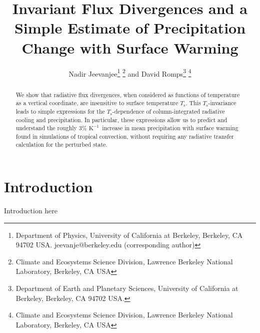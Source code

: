 \documentclass[10pt]{article}
\newcommand{\Ts}{\ensuremath{T_\mathrm{s}}}
\newcommand{\Kinverse}{\ensuremath{\mathrm{K^{-1}}}}
\begin{document}
%
%


\title{Invariant Flux Divergences and a Simple Estimate of Precipitation Change with Surface Warming}

%
%


 \author{Nadir Jeevanjee\footnote{Department of Physics, University of California at Berkeley, Berkeley, CA 94702  USA. jeevanje@berkeley.edu (corresponding author)} \footnote{Climate and Ecosystems Science Division, Lawrence Berkeley National Laboratory, Berkeley, CA USA} and David Romps\footnote{Department of Earth and Planetary Sciences, University of California at Berkeley, Berkeley, CA 94702  USA.} \footnote{Climate and Ecosystems Science Division, Lawrence Berkeley National Laboratory, Berkeley, CA USA}
}

\maketitle

\begin{abstract}
We show that radiative flux divergences, when considered as functions of temperature as a vertical coordinate, are insensitive to surface temperature \Ts. This \Ts-invariance  leads to simple expressions for the \Ts-dependence of column-integrated radiative cooling and precipitation. In particular, these expressions allow us to predict and understand the roughly 3\% \Kinverse\ increase in mean precipitation with surface warming found in simulations of tropical convection, without requiring any radiative transfer calculation for the perturbed state. 

%
%
\end{abstract}


%
%


\section {Introduction}
Introduction here
\end{document}
